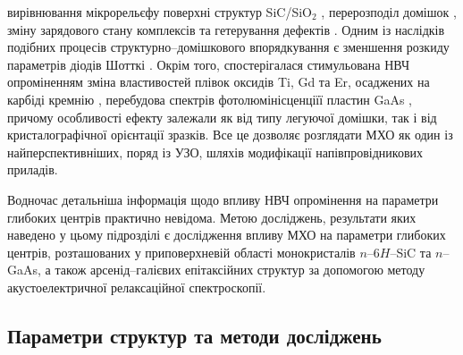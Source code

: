 вирівнювання мікрорельєфу поверхні структур SiC/SiO$_2$ \cite{Bacherikov2003r},
перерозподіл домішок \cite{Bacherikov2003r,Belyaev1998JTFr,Konakova2015},
зміну зарядового стану комплексів \cite{Milenin1994}
та гетерування дефектів \cite{Belyaev1998JTFr}.
Одним із наслідків подібних процесів структурно--домішкового впорядкування є зменшення розкиду параметрів діодів Шотткі \cite{Milenin1994,Belyaev1998JTFr}.
Окрім того, спостерігалася стимульована НВЧ опроміненням
зміна властивостей плівок оксидів Ti, Gd та Er, осаджених на карбіді кремнію \cite{Bacherikov2008},
перебудова спектрів фотолюмінісценціїї пластин GaAs \cite{BelyaevIntac,ProcSPIE,Belyaev1998JTFr},
причому особливості ефекту залежали як від типу легуючої домішки, так і від кристалографічної орієнтації зразків.
Все це дозволяє розглядати МХО як один із найперспективніших, поряд із УЗО, шляхів модифікації напівпровідникових приладів.

Водночас детальніша інформація щодо впливу НВЧ опромінення на параметри глибоких центрів практично невідома.
Метою досліджень, результати яких наведено у цьому підрозділі є дослідження впливу МХО на параметри глибоких центрів, розташованих у приповерхневій області монокристалів $n$--6$H$--SiC та $n$--GaAs, а також арсенід--галієвих епітаксійних структур за допомогою методу акустоелектричної релаксаційної спектроскопії.



\subsection{Параметри структур та методи досліджень}

